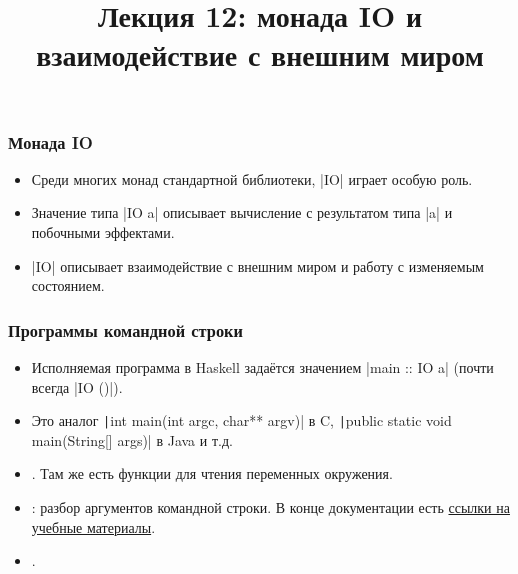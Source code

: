 \documentclass[11pt]{beamer}
\title{Лекция 12: монада IO и взаимодействие с внешним миром}
\begin{document}
\begin{frame}[plain]
  \maketitle
\end{frame}

\begin{frame}[fragile]
  \frametitle{Монада IO}
  \begin{itemize}
    \item Среди многих монад стандартной библиотеки, \haskinline|IO| играет особую роль.
    \item Значение типа \haskinline|IO a| описывает вычисление с результатом типа \haskinline|a| и побочными эффектами.
    \item \haskinline|IO| описывает взаимодействие с внешним миром и работу с изменяемым состоянием.
  \end{itemize}
\end{frame}

\begin{frame}[fragile]
  \frametitle{Программы командной строки}
  \begin{itemize}
    \item Исполняемая программа в Haskell задаётся значением
          \haskinline|main :: IO a| (почти всегда \haskinline|IO ()|).
    \item Это аналог \texttt|int main(int argc, char** argv)| в C, \texttt|public static void main(String[] args)| в Java и т.д.
    \item \href{https://hackage.haskell.org/package/base/docs/System-Environment.html}{}. Там же есть функции для чтения переменных окружения.
    \item {}: разбор аргументов командной строки. В конце документации есть \href{https://hackage.haskell.org/package/optparse-applicative\#:~:text=Tutorials,-These}{ссылки на учебные материалы}.
    \item \href{https://hackage.haskell.org/package/base/docs/System-Exit.html}{}.
  \end{itemize}
\end{frame}
\end{document}
